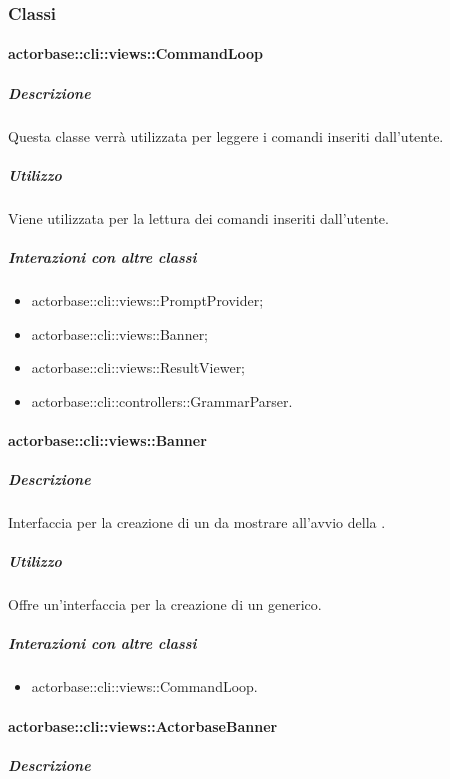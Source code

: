\documentclass{scalatekids-article}
\begin{document}
\subsubsection{Classi}

\paragraph{actorbase::cli::views::CommandLoop}

\subparagraph{Descrizione}

Questa classe verrà utilizzata per leggere i comandi inseriti dall'utente.

\subparagraph{Utilizzo}

Viene utilizzata per la lettura dei comandi inseriti dall'utente.

\subparagraph{Interazioni con altre classi}

\begin{itemize}
\item actorbase::cli::views::PromptProvider;
\item actorbase::cli::views::Banner;
\item actorbase::cli::views::ResultViewer;
\item actorbase::cli::controllers::GrammarParser.
\end{itemize}

\paragraph{actorbase::cli::views::Banner}

\subparagraph{Descrizione}

Interfaccia per la creazione di un  da mostrare all'avvio della
.

\subparagraph{Utilizzo}

Offre un'interfaccia per la creazione di un  generico.

\subparagraph{Interazioni con altre classi}

\begin{itemize}
\item actorbase::cli::views::CommandLoop.
\end{itemize}

\paragraph{actorbase::cli::views::ActorbaseBanner}

\subparagraph{Descrizione}
\end{document}
